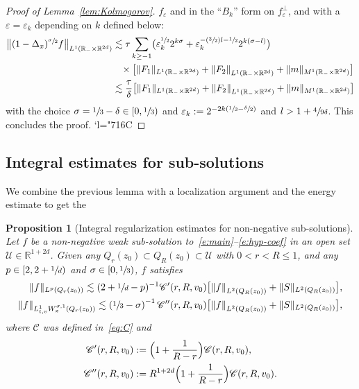 \documentclass[10pt]{amsart}
\let\mathcal\mathscr
\newcommand{\Psfrac}[2]{(\sfrac{#1}{#2})}
\newcommand{\Changelback}{\mathcode`l="716C}
\newtheorem{proposition}[theorem]{Proposition}
\theoremstyle{definition}
\theoremstyle{remark}
\newcommand{\norm}[1]{\left\| #1 \right\|}
\newcommand\R{{\mathbb R}}
\newcommand{\cC}{\mathcal C}
\newcommand{\cU}{\mathcal{U}}
\let\var\varepsilon
\begin{document}
\begin{proof}[Proof of Lemma~\ref{lem:Kolmogorov}]
$f_\var$ and in the ``$B_k$'' form on $f_\var^\bot$, and with
a $\var=\var_k$ depending on $k$ defined below:
\begin{align*}
\bigl\| (1-\Delta_x)^{\sfrac{\sigma}{2}} f \bigr\|_{L^1(\R_-
\times \R^{2d})}
& \lesssim \tau \sum_{k \ge -1} \bigl( \var_k
^{\sfrac12} 2^{k\sigma} + \var_k^{-\Psfrac{3}{2}l -\sfrac12}
2^{k(\sigma-l)} \bigr) \\
&\hspace*{3mm}
\times \bigl[ \| F_1 \|_{L^1(\R_- \times \R^{2d})}
+ \left\| F_2 \right\|_{L^1(\R_- \times \R^{2d})}
+ \| m \|_{M^1(\R_- \times \R^{2d})} \bigr]\\
& \lesssim
\frac{\tau}{\delta} \bigl[ \| F_1 \|_{L^1(\R_- \times \R^{2d})}
+ \left\| F_2 \right\|_{L^1(\R_- \times \R^{2d})}
+ \| m \|_{M^1(\R_- \times \R^{2d})} \bigr]
\end{align*}
with the choice $\sigma = \sfrac13 - \delta \in [0,\sfrac13)$ and
$\var_k := 2^{-2k(\sfrac13-\sfrac{\delta}{2})}$ and
$l> 1+\sfrac{4}{9\delta}$. This concludes the proof.
\Changelback
\end{proof}

\subsection{Integral estimates for sub-solutions}

We combine the previous lemma with a localization argument and
the energy estimate to get the
\begin{proposition}[Integral regularization estimates for
non-negative sub-solutions]
\label{prop:Gain sol}
Let $f$ be a non-negative weak sub-solution
to~\eqref{e:main}--\eqref{e:hyp-coef} in an open set
$\cU \in \R^{1+2d}$. Given any
$Q_r(z_0) \subset Q_R(z_0) \subset \cU$ with $0<r<R \le 1$, and
any $p \in [2,2+\sfrac1d)$ and $\sigma \in [0,\sfrac13)$, $f$
satisfies
\begin{align}
\label{eq:gain-int}
\|f\|_{L^{p}(Q_r(z_0))} \lesssim ( 2+ \sfrac1d - p)^{-1}
\cC'(r,R,v_0) \bigl[ \norm{f}_{L^{2}(Q_R(z_0))}
+ \|S\|_{L^2(Q_R(z_0))} \bigr] ,\\
\label{eq:gain-reg}
\| f \|_{L^1_{t,v}W^{\sigma,1}_x(Q_r(z_0))} \lesssim \left(
\sfrac13 - \sigma \right)^{-1}
\cC''(r,R,v_0) \bigl[ \norm{f}_{L^{2}(Q_R(z_0))}
+ \|S\|_{L^2(Q_R(z_0))} \bigr],
\end{align}
where $\cC$ was defined in~\eqref{eq:C} and
\begin{align*}
\cC'(r,R,v_0) &:= \Bigl( 1+ \frac{1}{R-r} \Bigr)
\cC(r,R,v_0),\\
\cC''(r,R,v_0) &:= R^{1+2d} \Bigl( 1+ \frac{1}{R-r} \Bigr)
\cC(r,R,v_0).
\end{align*}
\end{proposition}
\end{document}
